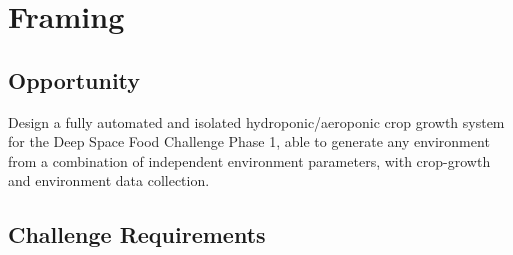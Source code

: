 \documentclass{report}
\begin{document}
\section{Framing}
\label{sec:framing}

\subsection{Opportunity}
\label{sec:opportunity}

Design a fully automated and isolated hydroponic/aeroponic crop growth system for the 
Deep Space Food Challenge Phase 1\cite{dsfc}, able to generate any environment from a 
combination of independent environment parameters, with crop-growth and environment data
collection.

\newpage

\subsection{Challenge Requirements}
\label{sec:requirements}
\end{document}

